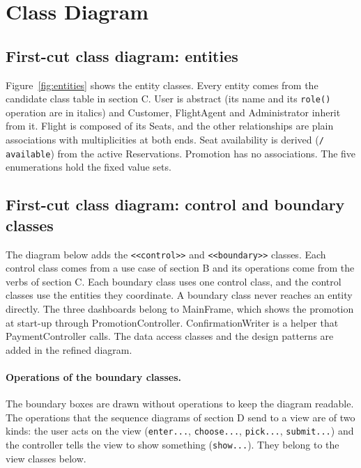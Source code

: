 \section{Class Diagram}

\subsection*{First-cut class diagram: entities}

Figure~\ref{fig:entities} shows the entity classes. Every entity comes from the
candidate class table in section C. User is abstract (its name and its
\texttt{role()} operation are in italics) and Customer, FlightAgent and
Administrator inherit from it. Flight is composed of its Seats, and the other
relationships are plain associations with multiplicities at both ends. Seat
availability is derived (\texttt{/ available}) from the active Reservations.
Promotion has no associations. The five enumerations hold the fixed value sets.


\subsection*{First-cut class diagram: control and boundary classes}

The diagram below adds the \texttt{<<control>>} and
\texttt{<<boundary>>} classes. Each control class comes from a use case of
section B and its operations come from the verbs of section C. Each boundary
class uses one control class, and the control classes use the entities they
coordinate. A boundary class never reaches an entity directly. The three
dashboards belong to MainFrame, which shows the promotion at start-up through
PromotionController. ConfirmationWriter is a helper that PaymentController
calls. The data access classes and the design patterns are added in the refined
diagram.


\paragraph{Operations of the boundary classes.} The boundary boxes are drawn
without operations to keep the diagram readable. The operations that the
sequence diagrams of section D send to a view are of two kinds: the user acts on
the view (\texttt{enter...}, \texttt{choose...}, \texttt{pick...},
\texttt{submit...}) and the controller tells the view to show something
(\texttt{show...}). They belong to the view classes below.

